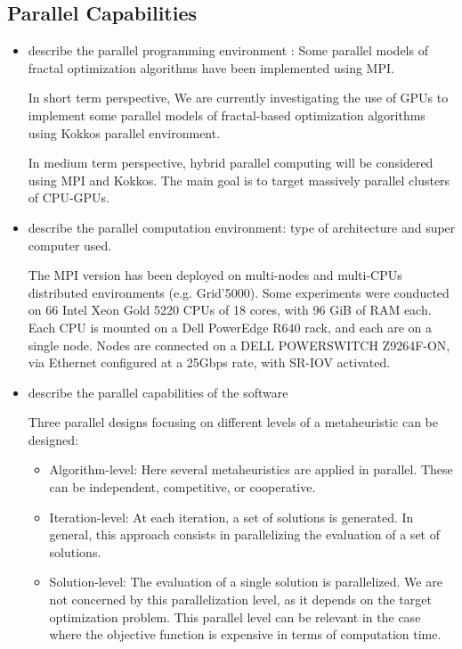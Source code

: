 \subsection{Parallel Capabilities}
\label{sec:WP5:Zellij:performances}

\begin{itemize}
    \item describe the parallel programming  environment : Some parallel models of fractal optimization algorithms have been implemented using MPI. 

    In short term perspective, We are currently investigating the use of GPUs to implement some parallel models of fractal-based optimization algorithms using Kokkos parallel environment.

    In medium term perspective, hybrid parallel computing will be considered using MPI and Kokkos. The main goal is to target massively parallel clusters of CPU-GPUs.
    
    \item describe the parallel computation environment: type of architecture and super computer used.
    
    The MPI version has been deployed on multi-nodes and multi-CPUs distributed environments (e.g. Grid'5000). Some experiments were conducted on 66 Intel Xeon Gold 5220 CPUs of 18 cores, with 96 GiB of RAM each. Each CPU is mounted on a Dell PowerEdge R640 rack, and each are on a single node. Nodes are connected on a DELL POWERSWITCH Z9264F-ON, via Ethernet configured at a 25Gbps rate, with SR-IOV activated.
    
    \item describe the parallel capabilities of the software

Three parallel designs focusing on different levels of a metaheuristic can be designed:
\begin{itemize}
    \item Algorithm-level: Here several metaheuristics are applied in parallel. These can be independent, competitive, or cooperative.
    \item Iteration-level: At each iteration, a set of solutions is generated. In general, this approach consists in parallelizing the evaluation of a set of solutions.
    \item Solution-level: The evaluation of a single solution is parallelized. We are not concerned by this parallelization level, as it depends on the target optimization problem. This parallel level can be relevant in the case where the objective function is expensive in terms of computation time.
\end{itemize}
    

\end{itemize}
